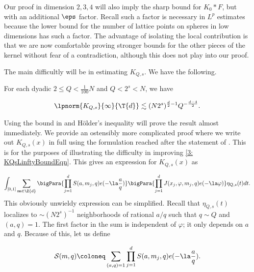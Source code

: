 \documentclass[11pt]{amsart}
\begin{document}
\begin{remark}\label{3: LossRemark}
    Our proof in dimension $2,3,4$ will also imply the sharp bound for $K_0*F$, but with an additional $\eps$ factor. Recall such a factor is necessary in $L^p$ estimates because the lower bound for the number of lattice points on spheres in low dimensions has such a factor. The advantage of isolating the local contribution is that we are now comfortable proving stronger bounds for the other pieces of the kernel without fear of a contradiction, although this does not play into our proof.
\end{remark}
\noindent
The main difficultly will be in estimating $K_{Q,s}$. We have the following.

\begin{proposition}\label{3: KQsLinftyBoundProp}
    For each dyadic $2\leq Q<\frac{1}{100}N$ and $Q<2^s<N$, we have

    \begin{equation}\label{3: KQsLinftyBoundEqn}
        \lpnorm{K_{Q,s}}{\infty}{\T{d}}\lesssim (N2^s)^{\frac{d}{2}-1}Q^{-\frac{d-4}{2}}.        
    \end{equation}
\end{proposition}
Using the bound in  and H\"older's inequality will prove the result almost immediately. We provide an ostensibly more complicated proof where we write out $K_{Q,s}(x)$ in full using the formulation reached after the statement of . This is for the purposes of illustrating the difficulty in improving \eqref{3: KQsLinftyBoundEqn}. This gives an expression for $K_{Q,s}(x)$ as

\begin{equation}\label{3: KQsFullyWrittenOutEqn}
\int_{[0,1]}\sum_{\mathbf{m}\in\Z{d}}\bigPara{\prod_{j=1}^dS(a,m_j,q)e(-\la \frac{a}{q})}\bigPara{\prod_{j=1}^dJ(x_j,\varphi,m_j,q)e(-\la\varphi)}\eta_{Q,s}(t)dt.
\end{equation}
This obviously unwieldy expression can be simplified. Recall that $\eta_{Q,s}(t)$ localizes to $\sim (N2^s)^{-1}$ neighborhoods of rational $a/q$ such that $q\sim Q$ and $(a,q)=1$. The first factor in the sum is independent of $\varphi$; it only depends on $a$ and $q$. Because of this, let us define 

\begin{equation}
    \mathcal{S}(m,q) \coloneq \sum_{(a,q)=1}\prod_{j=1}^dS(a,m_j,q)e(-\la \frac{a}{q}).
\end{equation}
\end{document}
